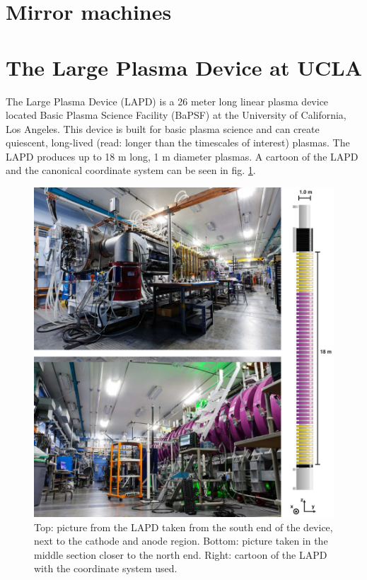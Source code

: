 \section{Mirror machines}


\section{The Large Plasma Device at UCLA}

The Large Plasma Device (LAPD)\cite{gekelman_upgraded_2016,qian_design_2023} is a 26 meter long linear plasma device located Basic Plasma Science Facility (BaPSF) at the University of California, Los Angeles. This device is built for basic plasma science and can create quiescent, long-lived (read: longer than the timescales of interest) plasmas. The LAPD produces up to 18 m long, 1 m diameter plasmas. A cartoon of the LAPD and the canonical coordinate system can be seen in fig. \ref{fig:lapd-pics}.

\begin{figure}
	\centering
	\includegraphics[width=400pt]{figures/lapd_pics.jpg}
	\caption[Pictures of the LAPD]{\label{fig:lapd-pics}Top: picture from the LAPD taken from the south end of the device, next to the cathode and anode region. Bottom: picture taken in the middle section closer to the north end. Right: cartoon of the LAPD with the coordinate system used.}
\end{figure}

